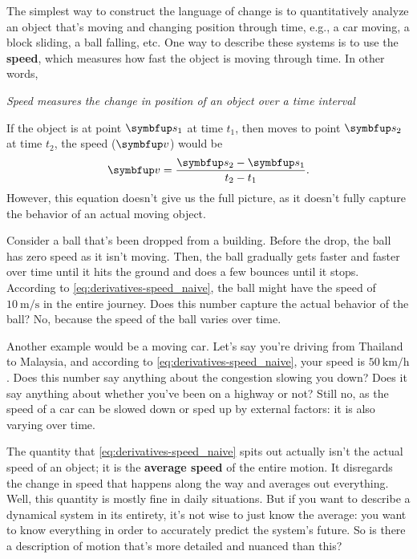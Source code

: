 The simplest way to construct the language of change is to quantitatively analyze an object that's moving and changing position through time, e.g., a car moving, a block sliding, a ball falling, etc. One way to describe these systems is to use the \textbf{speed}, which measures how fast the object is moving through time. In other words,
\begin{displayquote}
  \emph{Speed measures the change in position of an object over a time interval}
\end{displayquote}

If the object is at point \(\vv{s}_1\) at time \(t_1\), then moves to point \(\vv{s}_2\) at time \(t_2\), the speed (\(\vv{v}\)) would be
\begin{equation}
  \vv{v} = \frac{\vv{s}_2 - \vv{s}_1}{t_2 - t_1} \label{eq:derivatives-speed_naive}.
\end{equation}
However, this equation doesn't give us the full picture, as it doesn't fully capture the behavior of an actual moving object.

Consider a ball that's been dropped from a building. Before the drop, the ball has zero speed as it isn't moving. Then, the ball gradually gets faster and faster over time until it hits the ground and does a few bounces until it stops. According to \cref{eq:derivatives-speed_naive}, the ball might have the speed of \(\qty{10}{\meter\per\second}\) in the entire journey. Does this number capture the actual behavior of the ball? No, because the speed of the ball varies over time.

Another example would be a moving car. Let's say you're driving from Thailand to Malaysia, and according to \cref{eq:derivatives-speed_naive}, your speed is \(\qty{50}{\kilo\meter\per\hour}\). Does this number say anything about the congestion slowing you down? Does it say anything about whether you've been on a highway or not? Still no, as the speed of a car can be slowed down or sped up by external factors: it is also varying over time.

The quantity that \cref{eq:derivatives-speed_naive} spits out actually isn't the actual speed of an object; it is the \textbf{average speed} of the entire motion. It disregards the change in speed that happens along the way and averages out everything. Well, this quantity is mostly fine in daily situations. But if you want to describe a dynamical system in its entirety, it's not wise to just know the average: you want to know everything in order to accurately predict the system's future. So is there a description of motion that's more detailed and nuanced than this?

